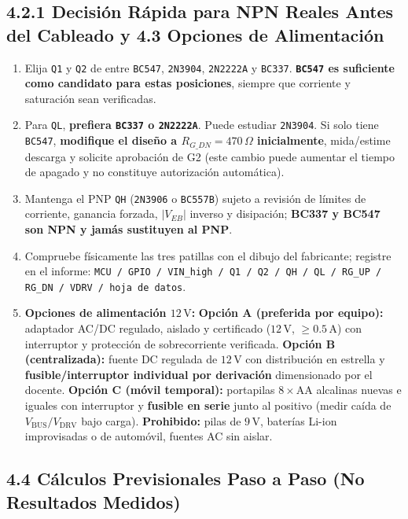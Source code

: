 \documentclass[10pt, a4paper, landscape]{article}
\begin{document}
\subsection*{4.2.1 Decisión Rápida para NPN Reales Antes del Cableado y 4.3 Opciones de Alimentación}
\begin{enumerate}[noitemsep, topsep=2pt]
    \item Elija \texttt{Q1} y \texttt{Q2} de entre \texttt{BC547}, \texttt{2N3904}, \texttt{2N2222A} y \texttt{BC337}. \textbf{\texttt{BC547} es suficiente como candidato para estas posiciones}, siempre que corriente y saturación sean verificadas.
    \item Para \texttt{QL}, \textbf{prefiera \texttt{BC337} o \texttt{2N2222A}}. Puede estudiar \texttt{2N3904}. Si solo tiene \texttt{BC547}, \textbf{modifique el diseño a $R_{G\_DN}=470\,\Omega$ inicialmente}, mida/estime descarga y solicite aprobación de G2 (este cambio puede aumentar el tiempo de apagado y no constituye autorización automática).
    \item Mantenga el PNP \texttt{QH} (\texttt{2N3906} o \texttt{BC557B}) sujeto a revisión de límites de corriente, ganancia forzada, $|V_{EB}|$ inverso y disipación; \textbf{BC337 y BC547 son NPN y jamás sustituyen al PNP}.
    \item Compruebe físicamente las tres patillas con el dibujo del fabricante; registre en el informe: \texttt{MCU / GPIO / VIN\_high / Q1 / Q2 / QH / QL / RG\_UP / RG\_DN / VDRV / hoja de datos}.
    \item \textbf{Opciones de alimentación $12\,\text{V}$:} \textbf{Opción A (preferida por equipo):} adaptador AC/DC regulado, aislado y certificado ($12\,\text{V}$, $\ge 0.5\,\text{A}$) con interruptor y protección de sobrecorriente verificada. \textbf{Opción B (centralizada):} fuente DC regulada de $12\,\text{V}$ con distribución en estrella y \textbf{fusible/interruptor individual por derivación} dimensionado por el docente. \textbf{Opción C (móvil temporal):} portapilas $8\times\text{AA}$ alcalinas nuevas e iguales con interruptor y \textbf{fusible en serie} junto al positivo (medir caída de $V_{\text{BUS}}/V_{\text{DRV}}$ bajo carga). \textbf{Prohibido:} pilas de $9\,\text{V}$, baterías Li-ion improvisadas o de automóvil, fuentes AC sin aislar.
\end{enumerate}

\newpage
\subsection*{4.4 Cálculos Previsionales Paso a Paso (No Resultados Medidos)}
\end{document}
